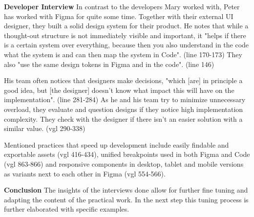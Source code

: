 \textbf{Developer Interview}
In contrast to the developers Mary worked with, Peter has worked with Figma for quite some time.
Together with their external UI designer, they built a solid design system for their product. He
notes that while a thought-out structure is not immediately visible and important, it "helps if
there is a certain system over everything, because then you also understand in the code what the
system is and can then map the system in Code". (line 170-173) They also "use the same design tokens 
in Figma and in the code". (line 146)

His team often notices that designers make decisions, "which [are] in principle a good idea, but
[the designer] doesn't know what impact this will have on the implementation". (line 281-284) As he
and his team try to minimize unnecessary overload, they evaluate and question designs if they notice
high implementation complexity. They check with the designer if there isn't an easier solution with
a similar value. (vgl 290-338)

Mentioned practices that speed up development include easily findable and exportable assets (vgl
416-434), unified breakpoints used in both Figma and Code (vgl 863-866) and responsive components in
desktop, tablet and mobile versions as variants next to each other in Figma (vgl 554-566).

\textbf{Conclusion}
The insights of the interviews done allow for further fine tuning and adapting the content of the
practical work. In the next step this tuning process is further elaborated with specific examples.
